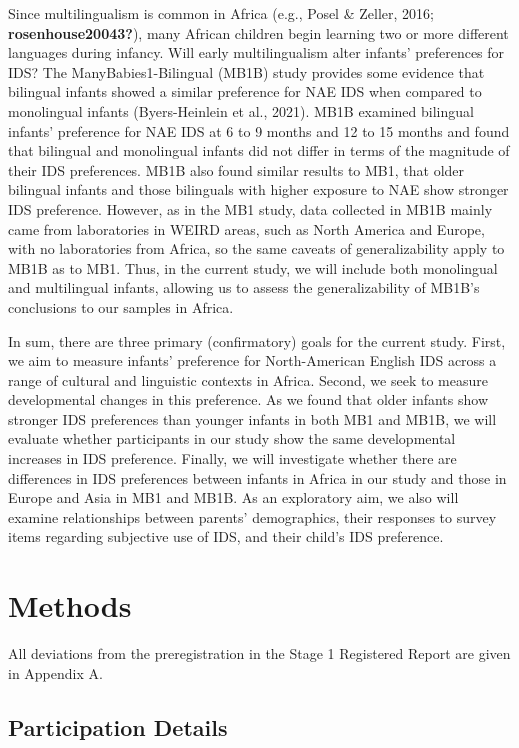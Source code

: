 \documentclass[
  ,man,floatsintext]{apa6}
\begin{document}
Since multilingualism is common in Africa (e.g., Posel \& Zeller, 2016; \textbf{rosenhouse20043?}), many African children begin learning two or more different languages during infancy. Will early multilingualism alter infants' preferences for IDS? The ManyBabies1-Bilingual (MB1B) study provides some evidence that bilingual infants showed a similar preference for NAE IDS when compared to monolingual infants (Byers-Heinlein et al., 2021). MB1B examined bilingual infants' preference for NAE IDS at 6 to 9 months and 12 to 15 months and found that bilingual and monolingual infants did not differ in terms of the magnitude of their IDS preferences. MB1B also found similar results to MB1, that older bilingual infants and those bilinguals with higher exposure to NAE show stronger IDS preference. However, as in the MB1 study, data collected in MB1B mainly came from laboratories in WEIRD areas, such as North America and Europe, with no laboratories from Africa, so the same caveats of generalizability apply to MB1B as to MB1. Thus, in the current study, we will include both monolingual and multilingual infants, allowing us to assess the generalizability of MB1B's conclusions to our samples in Africa.

In sum, there are three primary (confirmatory) goals for the current study. First, we aim to measure infants' preference for North-American English IDS across a range of cultural and linguistic contexts in Africa. Second, we seek to measure developmental changes in this preference. As we found that older infants show stronger IDS preferences than younger infants in both MB1 and MB1B, we will evaluate whether participants in our study show the same developmental increases in IDS preference. Finally, we will investigate whether there are differences in IDS preferences between infants in Africa in our study and those in Europe and Asia in MB1 and MB1B. As an exploratory aim, we also will examine relationships between parents' demographics, their responses to survey items regarding subjective use of IDS, and their child's IDS preference.

\hypertarget{methods}{%
\section{Methods}\label{methods}}

All deviations from the preregistration in the Stage 1 Registered Report are given in Appendix A.

\hypertarget{participation-details}{%
\subsection{Participation Details}\label{participation-details}}
\end{document}

